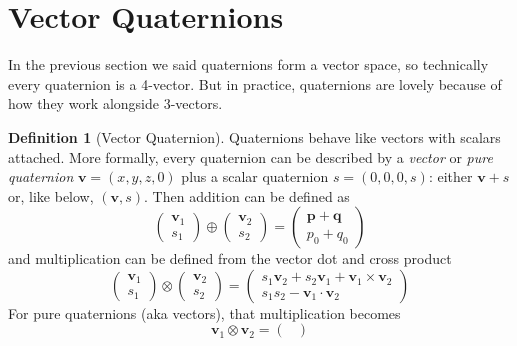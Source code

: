 \documentclass{amsart}
\theoremstyle{definition}
\newtheorem{definition}[theorem]{Definition}
\theoremstyle{remark}
\numberwithin{equation}{section}
\begin{document}
\section{Vector Quaternions}
In the previous section we said quaternions form a vector space, so technically every quaternion is a 4-vector. But in practice, quaternions are lovely because of how they work alongside 3-vectors.
\begin{definition}[Vector Quaternion]
  Quaternions behave like vectors with scalars attached. More formally, every quaternion can be described by a \emph{vector} or \emph{pure quaternion} $\mathbf{v}=\left(x, y, z, 0\right)$ plus a scalar quaternion $s=\left(0,0,0,s\right)$: either $\mathbf{v}+s$ or, like below, $(\mathbf{v}, s)$. Then addition can be defined as
  \begin{equation}
    \begin{pmatrix}
      \mathbf{v}_1 \\
      s_1
    \end{pmatrix}
    \oplus
    \begin{pmatrix}
      \mathbf{v}_2 \\
      s_2
    \end{pmatrix}
    =
    \begin{pmatrix}
      \mathbf{p} + \mathbf{q}\\
			p_0 + q_0
    \end{pmatrix}
  \end{equation}
  and multiplication can be defined from the vector dot and cross product
  \begin{equation}
    \begin{pmatrix}
      \mathbf{v}_1 \\
      s_1
    \end{pmatrix}
    \otimes
    \begin{pmatrix}
      \mathbf{v}_2 \\
      s_2
    \end{pmatrix}
    =
    \begin{pmatrix}
      s_1\mathbf{v}_2 + s_2\mathbf{v}_1 + \mathbf{v}_1\times \mathbf{v}_2 \\
      s_1s_2 - \mathbf{v}_1\cdot \mathbf{v}_2
    \end{pmatrix}
  \end{equation}
  For pure quaternions (aka vectors), that multiplication becomes
  \begin{equation}
    \mathbf{v}_1\otimes\mathbf{v}_2 =
    \begin{pmatrix}

\end{pmatrix}
\end{equation}
\end{definition}
\end{document}
